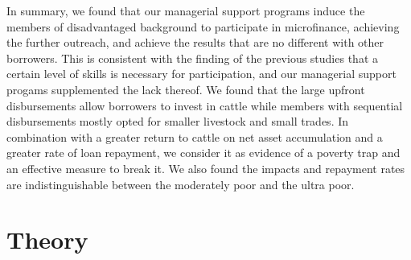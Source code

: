 	In summary, we found that our managerial support programs induce the members of disadvantaged background to participate in microfinance, achieving the further outreach, and achieve the results that are no different with other borrowers. This is consistent with the finding of the previous studies that a certain level of skills is necessary for participation, and our managerial support progams supplemented the lack thereof. 	We found that the large upfront disbursements allow borrowers to invest in cattle while members with sequential disbursements mostly opted for smaller livestock and small trades. In combination with a greater return to cattle on net asset accumulation and a greater rate of loan repayment, we consider it as evidence of a poverty trap and an effective measure to break it. We also found the impacts and repayment rates are indistinguishable between the moderately poor and the ultra poor.




\section{Theory}
\label{SecTheory}


